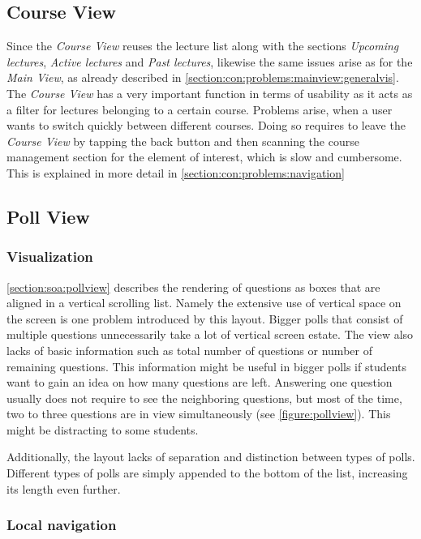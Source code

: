 \subsection{Course View}
\label{section:con:problems:courseview}
Since the \emph{Course View} reuses the lecture list along with the sections \emph{Upcoming lectures}, \emph{Active lectures} and \emph{Past lectures}, likewise the same issues arise as for the \emph{Main View}, as already described in  \autoref{section:con:problems:mainview:generalvis}. 
The \emph{Course View} has a very important function in terms of usability as it acts as a filter for lectures belonging to a certain course. Problems arise, when a user wants to switch quickly between different courses. Doing so requires to leave the \emph{Course View} by tapping the back button and then scanning the course management section for the element of interest, which is slow and cumbersome. This is explained in more detail in \autoref{section:con:problems:navigation}

\subsection{Poll View}

\subsubsection{Visualization}
\label{section:con:problems:pollview}

\autoref{section:soa:pollview} describes the rendering of questions as boxes that are aligned in a vertical scrolling list. Namely the extensive use of vertical space on the screen is one problem introduced by this layout. Bigger polls that consist of multiple questions unnecessarily take a lot of vertical screen estate. The view also lacks of basic information such as total number of questions or number of remaining questions. This information might be useful in bigger polls if students want to gain an idea on how many questions are left.
Answering one question usually does not require to see the neighboring questions, but most of the time, two to three questions are in view simultaneously (see \autoref{figure:pollview}). This might be distracting to some students.

Additionally, the layout lacks of separation and distinction between types of polls.
Different types of polls are simply appended to the bottom of the list, increasing its length even further.
\todogrf
\subsubsection{Local navigation}

